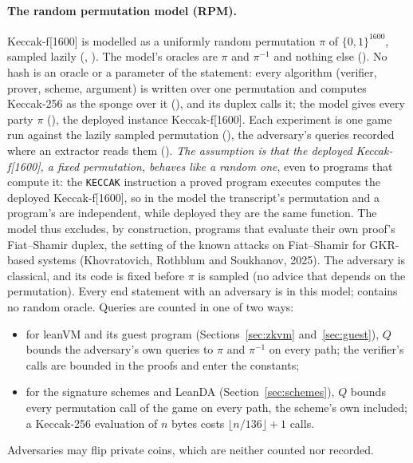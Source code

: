 \documentclass[11pt]{article}
\begin{document}
\paragraph{The random permutation model (RPM).} Keccak-f[1600] is modelled as a uniformly random
permutation $\pi$ of $\{0,1\}^{1600}$, sampled lazily (,
). The model's oracles are $\pi$ and $\pi^{-1}$ and
nothing else (). No hash is an oracle or a parameter of
the statement: every algorithm (verifier, prover, scheme, argument) is written over one
permutation and computes Keccak-256 as the sponge over it (), and its duplex
calls it; the model gives every party $\pi$ (), the deployed
instance Keccak-f[1600]. Each experiment is one game run against the lazily sampled permutation
(), the adversary's queries recorded where an extractor reads
them (). \emph{The assumption is that the
deployed Keccak-f[1600], a fixed permutation, behaves like a random one}, even to programs that
compute it: the \texttt{KECCAK} instruction a proved program executes computes the deployed
Keccak-f[1600], so in the model the transcript's permutation and a program's are independent,
while deployed they are the same function. The model thus excludes, by construction, programs that
evaluate their own proof's Fiat--Shamir duplex, the setting of the known attacks on Fiat--Shamir
for GKR-based systems (Khovratovich, Rothblum and Soukhanov, 2025). The adversary is classical,
and its code is fixed before $\pi$ is sampled (no advice that depends on the permutation). Every end statement with
an adversary is in this model;  contains no random oracle. Queries are counted in
one of two ways:
\begin{itemize}
\item for leanVM and its guest program (Sections~\ref{sec:zkvm} and~\ref{sec:guest}), $Q$ bounds
the adversary's own queries to $\pi$ and $\pi^{-1}$ on every path; the verifier's calls are bounded
in the proofs and enter the constants;
\item for the signature schemes and LeanDA (Section~\ref{sec:schemes}), $Q$ bounds every
permutation call of the game on every path, the scheme's own included; a Keccak-256 evaluation of
$n$ bytes costs $\lfloor n/136\rfloor + 1$ calls.
\end{itemize}
Adversaries may flip private coins, which are neither counted nor recorded.
\end{document}
